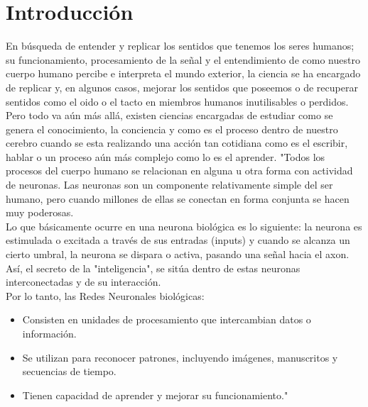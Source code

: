 \documentclass[conference]{IEEEtran}
\begin{document}
\section{Introducción}
En búsqueda  de entender y replicar los sentidos que tenemos los seres humanos; su funcionamiento, procesamiento de la señal y el entendimiento de como nuestro cuerpo humano percibe e interpreta el mundo exterior, la ciencia se ha encargado de replicar y, en algunos casos, mejorar los sentidos que poseemos o de recuperar sentidos como el oido o el tacto en miembros humanos inutilisables o perdidos. Pero todo va aún más allá, existen ciencias encargadas de estudiar como se genera el conocimiento, la conciencia y como es el proceso dentro de nuestro cerebro cuando se esta realizando una acción tan cotidiana como es el escribir, hablar o un proceso aún más complejo como lo es el aprender. "Todos los procesos del cuerpo humano se relacionan en alguna u otra forma con actividad de neuronas. Las neuronas son un componente relativamente simple del ser humano, pero cuando millones de ellas se conectan en forma conjunta se hacen muy poderosas. \\
Lo que básicamente ocurre en una neurona biológica es lo siguiente: la neurona es estimulada o excitada a través de sus entradas (inputs) y cuando se alcanza un cierto umbral, la neurona se dispara o activa, pasando una señal hacia el axon. Así, el secreto de la "inteligencia", se sitúa dentro de estas neuronas interconectadas y de su interacción.\\

Por lo tanto, las Redes Neuronales biológicas:

\begin{itemize}
	\item Consisten en unidades de procesamiento que intercambian datos o información.
	\item Se utilizan para reconocer patrones, incluyendo imágenes, manuscritos y secuencias de tiempo.
	\item Tienen capacidad de aprender y mejorar su funcionamiento."\cite{walter}
\end{itemize}
\end{document}
